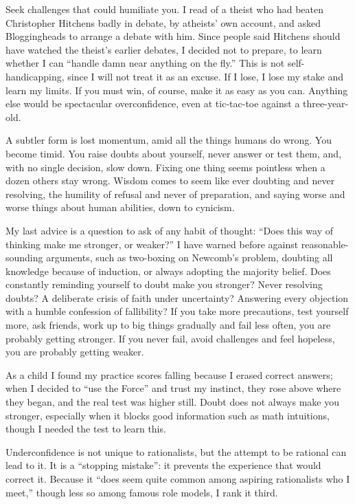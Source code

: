 Seek challenges that could humiliate you. I read of a theist who had beaten Christopher Hitchens badly in debate, by atheists' own account, and asked Bloggingheads to arrange a debate with him. Since people said Hitchens should have watched the theist's earlier debates, I decided not to prepare, to learn whether I can ``handle damn near anything on the fly.'' This is not self-handicapping, since I will not treat it as an excuse.  If I lose, I lose my stake and learn my limits. If you must win, of course, make it as easy as you can. Anything else would be spectacular overconfidence, even at tic-tac-toe against a three-year-old.

A subtler form is lost momentum, amid all the things humans do wrong. You become timid. You raise doubts about yourself, never answer or test them, and, with no single decision, slow down. Fixing one thing seems pointless when a dozen others stay wrong. Wisdom comes to seem like ever doubting and never resolving, the humility of refusal and never of preparation, and saying worse and worse things about human abilities, down to cynicism.

My last advice is a question to ask of any habit of thought: ``Does this way of thinking make me stronger, or weaker?'' I have warned before against reasonable-sounding arguments, such as two-boxing on Newcomb's problem, doubting all knowledge because of induction, or always adopting the majority belief.  Does constantly reminding yourself to doubt make you stronger? Never resolving doubts? A deliberate crisis of faith under uncertainty? Answering every objection with a humble confession of fallibility? If you take more precautions, test yourself more, ask friends, work up to big things gradually and fail less often, you are probably getting stronger. If you never fail, avoid challenges and feel hopeless, you are probably getting weaker.

As a child I found my practice scores falling because I erased correct answers; when I decided to ``use the Force'' and trust my instinct, they rose above where they began, and the real test was higher still. Doubt does not always make you stronger, especially when it blocks good information such as math intuitions, though I needed the test to learn this. 

Underconfidence is not unique to rationalists, but the attempt to be rational can lead to it. It is a ``stopping mistake'': it prevents the experience that would correct it. Because it ``does seem quite common among aspiring rationalists who I meet,'' though less so among famous role models, I rank it third.
